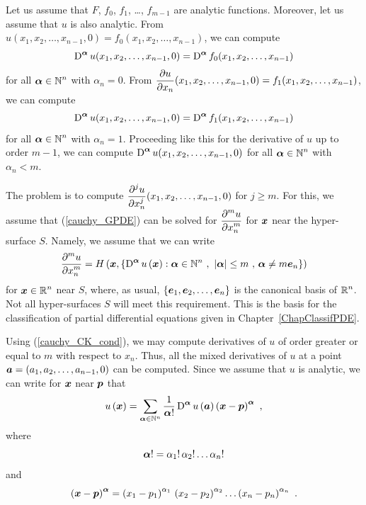 Let us assume that $F$, $f_0$, $f_1$, \ldots , $f_{m-1}$ are analytic
functions.  Moreover, let us assume that $u$ is also analytic.
From $u(x_1,x_2, \ldots, x_{n-1},0) = f_0(x_1,x_2, \ldots, x_{n-1})$,
we can compute
\[
\operatorname{D}^{{\bm{\alpha}}} u(x_1, x_2, \ldots, x_{n-1}, 0) =
\operatorname{D}^{{\bm{\alpha}}} f_0(x_1, x_2, \ldots, x_{n-1})
\]
for all $\displaystyle {\bm{\alpha}} \in \mathbb{N}^n$ with $\alpha_n = 0$.
From $\displaystyle \frac{\partial{u}}{\partial x_n}(x_1,x_2, \ldots, x_{n-1},0)
= f_1(x_1,x_2, \ldots, x_{n-1})$,
we can compute
\[
\operatorname{D}^{{\bm{\alpha}}} u(x_1, x_2, \ldots, x_{n-1}, 0) =
\operatorname{D}^{{\bm{\alpha}}} f_1(x_1, x_2, \ldots, x_{n-1})
\]
for all $\displaystyle {\bm{\alpha}} \in \mathbb{N}^n$ with $\alpha_n = 1$.
Proceeding like this for the derivative of $u$ up to order $m-1$, we
can compute
$\displaystyle \operatorname{D}^{{\bm{\alpha}}} u(x_1, x_2, \ldots, x_{n-1}, 0)$ for
all $\displaystyle {\bm{\alpha}} \in \mathbb{N}^n$ with $\alpha_n < m$.

The problem is to compute
$\displaystyle \frac{\displaystyle \partial^{j}{u}} {\displaystyle \partial x_n^{j}}(x_1,x_2,\ldots,x_{n-1},0)$ for $j\geq m$.
For this, we assume that (\ref{cauchy_GPDE}) can be solved for
$\displaystyle \frac{\displaystyle \partial^{m}{u}} {\displaystyle \partial x_n^{m}}$ for ${\bm{x}}$ near the hyper-surface $S$.
Namely, we assume that we can write
\begin{equation} \label{cauchy_CK_cond}
\DS \pdydxn{u}{x_n}{m} = H\left(\VEC{x},
\left\{ \diff^{\VEC{\alpha}} u\left(\VEC{x}\right) :
\VEC{\alpha} \in \NN^n \ , \ 
|\VEC{\alpha}| \leq m \ , \, \VEC{\alpha} \neq m \VEC{e}_n \right\} \right)
\end{equation}
for $\displaystyle {\bm{x}} \in \mathbb{R}^n$ near $S$, where, as usual,
$\displaystyle \left\{ {\bm{e}}_1, {\bm{e}}_2, \ldots, {\bm{e}}_n\right\}$ 
is the canonical basis of $\displaystyle \mathbb{R}^n$.  Not all
hyper-surfaces $S$ will meet this requirement.   This is the basis for
the classification of partial differential equations given in
Chapter~\ref{ChapClassifPDE}.

Using (\ref{cauchy_CK_cond}), we may compute derivatives of $u$ of
order greater or equal to $m$ with respect to $x_n$.  Thus, all the
mixed derivatives of $u$ at a point
${\bm{a}} = (a_1,a_2, \ldots, a_{n-1}, 0)$
can be computed.  Since we assume that $u$ is analytic, we can write
for ${\bm{x}}$ near ${\bm{p}}$ that
\[
u\left({\bm{x}}\right) =
\sum_{{\bm{\alpha}} \in \mathbb{N}^n} \frac{1}{{\bm{\alpha}}!}
\operatorname{D}^{{\bm{\alpha}}} u\left({\bm{a}}\right)
\left( {\bm{x}}- {\bm{p}} \right)^{{\bm{\alpha}}} \ ,
\]
where
\[
{\bm{\alpha}}! = \alpha_1!\,\alpha_2!\ldots \alpha_n!
\]
and
\[
\left( {\bm{x}}- {\bm{p}} \right)^{{\bm{\alpha}}} =
\left(x_1-p_1\right)^{\alpha_1}\,\left(x_2-p_2\right)^{\alpha_2}\ldots
\left(x_n-p_n\right)^{\alpha_n} \ .
\]

